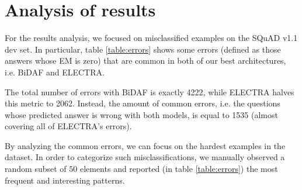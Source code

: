 \documentclass[a4paper,10pt]{report}
\begin{document}
\chapter{Analysis of results}\label{chap:analysis-results}
For the results analysis, we focused on misclassified examples on the SQuAD v1.1 dev set. In particular, table \ref{table:errors} shows some errors (defined as those answers whose EM is zero) that are common in both of our best architectures, i.e. BiDAF and ELECTRA.

The total number of errors with BiDAF is exactly \num{4222}, while ELECTRA halves this metric to \num{2062}. Instead, the amount of common errors, i.e. the questions whose predicted answer is wrong with both models, is equal to \num{1535} (almost covering all of ELECTRA's errors).

By analyzing the common errors, we can focus on the hardest examples in the dataset. In order to categorize such misclassifications, we manually observed a random subset of $50$ elements and reported (in table \ref{table:errors}) the most frequent and interesting patterns.
\end{document}
